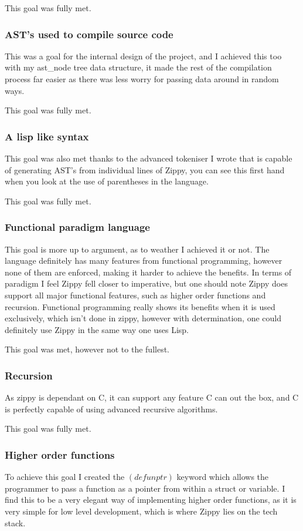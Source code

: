 \documentclass[a4paper,12pt]{article}
\begin{document}
{This goal was fully met.

\subsubsection{AST's used to compile source code}
This was a goal for the internal design of the project, and I achieved this too with my ast\_node tree data structure, 
it made the rest of the compilation process far easier as there was less worry for passing data around in random ways.

This goal was fully met.

\subsubsection{A lisp like syntax}
This goal was also met thanks to the advanced tokeniser I wrote that is capable of generating AST's from individual lines 
of Zippy, you can see this first hand when you look at the use of parentheses in the language.

This goal was fully met.

\subsubsection{Functional paradigm language}
This goal is more up to argument, as to weather I achieved it or not. The language definitely has many features from functional
programming, however none of them are enforced, making it harder to achieve the benefits. In terms of paradigm I feel Zippy
fell closer to imperative, but one should note Zippy does support all major functional features, such as higher order functions and
recursion. Functional programming really shows its benefits when it is used exclusively, which isn't done in zippy, however with 
determination, one could definitely use Zippy in the same way one uses Lisp.

This goal was met, however not to the fullest.

\subsubsection{Recursion}
As zippy is dependant on C, it can support any feature C can out the box, and C is perfectly capable of using advanced recursive 
algorithms.

This goal was fully met.

\subsubsection{Higher order functions}
To achieve this goal I created the \((defunptr)\) keyword which allows the programmer to pass a function as a pointer from within 
a struct or variable. I find this to be a very elegant way of implementing higher order functions, as it is very simple for 
low level development, which is where Zippy lies on the tech stack.

}
\end{document}
